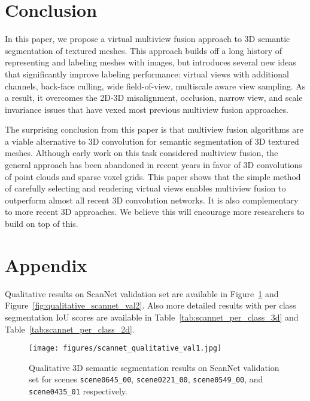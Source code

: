 \documentclass[runningheads]{llncs}
\begin{document}
 \section{Conclusion}\label{sec:conclusion}

In this paper, we propose a virtual multiview fusion approach to 3D semantic segmentation of textured meshes.   This approach builds off a long history of representing and labeling meshes with images, but introduces several new ideas that significantly improve labeling performance: virtual views with additional channels, back-face culling, wide field-of-view, multiscale aware view sampling.  As a result, it overcomes the 2D-3D misalignment, occlusion, narrow view, and scale invariance issues that have vexed most previous multiview fusion approaches.

The surprising conclusion from this paper is that multiview fusion algorithms are a viable alternative to 3D convolution for semantic segmentation of 3D textured meshes.  Although early work on this task considered multiview fusion, the general approach has been abandoned in recent years in favor of 3D convolutions of point clouds and sparse voxel grids. This paper shows that the simple method of carefully selecting and rendering virtual views enables multiview fusion to outperform almost all recent 3D convolution networks. It is also complementary to more recent 3D approaches. We believe this will encourage more researchers to build on top of this. 
\clearpage



\section{Appendix}\label{sec:appendix}

Qualitative results on ScanNet validation set are available in Figure~\ref{fig:qualitative_scannet_val1} and Figure~\ref{fig:qualitative_scannet_val2}. Also more detailed results with per class segmentation IoU scores are available in Table~\ref{tab:scannet_per_class_3d} and Table~\ref{tab:scannet_per_class_2d}.

\begin{figure}
\texttt{[image: figures/scannet\_qualitative\_val1.jpg]}
\caption{Qualitative 3D semantic segmentation results on ScanNet validation set for scenes \texttt{scene0645\_00}, \texttt{scene0221\_00}, \texttt{scene0549\_00}, and \texttt{scene0435\_01} respectively.}
\label{fig:qualitative_scannet_val1}
\end{figure}
\end{document}

